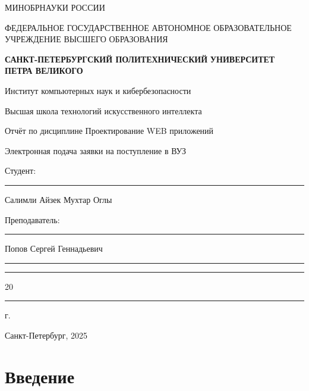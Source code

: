 \documentclass[areasetadvanced]{scrartcl}
\begin{document}
\sloppy 
	\thispagestyle{empty}
	\begin{center}
		\large{МИНОБРНАУКИ РОССИИ} \par
		\vspace{0.3cm}
		\normalsize
		{ФЕДЕРАЛЬНОЕ ГОСУДАРСТВЕННОЕ АВТОНОМНОЕ ОБРАЗОВАТЕЛЬНОЕ УЧРЕЖДЕНИЕ ВЫСШЕГО ОБРАЗОВАНИЯ} \par
		\vspace{0.3cm}
		\textbf{\guillemotleft САНКТ-ПЕТЕРБУРГСКИЙ ПОЛИТЕХНИЧЕСКИЙ}
		\textbf{УНИВЕРСИТЕТ ПЕТРА ВЕЛИКОГО\guillemotright} \par
		\vspace{0.3cm}
		{Институт компьютерных наук и кибербезопасности}\par
		{Высшая школа технологий искусственного интеллекта}\par
	\end{center}
	\vfill
	\begin{center}
		{\large Отчёт по дисциплине \guillemotleft Проектирование WEB приложений\guillemotright}\par
		{\huge   
		\guillemotleft Электронная подача заявки на поступление в ВУЗ\guillemotright}\par
         
	\end{center}
	\vfill
	\begin{flushleft}
		Студент: \hspace{1.8cm} \rule[0pt]{2.5cm}{0.5pt}\hfill Салимли Айзек Мухтар Оглы\par
		\vspace{1.5cm}
		Преподаватель: \hspace{0.55cm} \rule[0pt]{2.5cm}{0.5pt}\hfill  Попов Сергей Геннадьевич
	\end{flushleft}
	\vspace{0.5cm}
	\begin{flushright}
		\guillemotleft \rule[0pt]{0.8cm}{0.5pt}\guillemotright \rule[0pt]{2cm}{0.5pt} 20\rule[0pt]{0.5cm}{0.5pt} г.
	\end{flushright}
	\vfill
	\begin{center}
		Санкт-Петербург, 2025
	\end{center}
	\newpage
	\tableofcontents
	\newpage
\section*{Введение}
\end{document}
